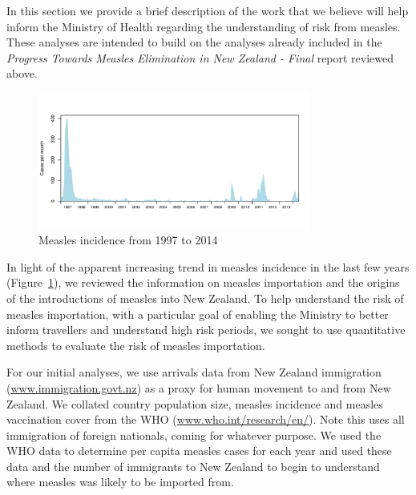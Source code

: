 \documentclass{article}
\begin{document}
In this section we provide a brief description of the work that we believe will help inform the Ministry of Health regarding the understanding of risk from measles. These analyses are intended to build on the analyses already included in the \emph {Progress Towards Measles Elimination in New Zealand - Final} report reviewed above.

\begin{figure}
     \centering
     \includegraphics[width=0.8\textwidth]{incidence_1997_2014.pdf}
     \caption{Measles incidence from 1997 to 2014}
     \label{fig:incidence1997}
\end{figure}

In light of the apparent increasing trend in measles incidence in the last few years (Figure~\ref{fig:incidence1997}), we reviewed the information on measles importation and the origins of the introductions of measles into New Zealand. To help understand the risk of measles importation, with a particular goal of enabling the Ministry to better inform travellers and understand high risk periods, we sought to use quantitative methods to evaluate the risk of measles importation. 

For our initial analyses, we use arrivals data from New Zealand immigration (\href{http://www.immigration.govt.nz/}{www.immigration.govt.nz}) as a proxy for human movement to and from New Zealand. We collated country population size, measles incidence and measles vaccination cover from the WHO (\href{http://www.who.int/research/en/}{www.who.int/research/en/}). Note this uses all immigration of foreign nationals, coming for whatever purpose. We used the WHO data to determine per capita measles cases for each year and used these data and the number of immigrants to New Zealand to begin to understand where measles was likely to be imported from.
\end{document}
